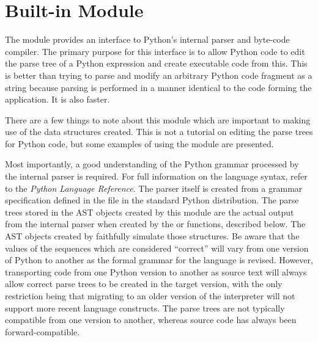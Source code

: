 %
%

\section{Built-in Module }
\label{module-parser}

The  module provides an interface to Python's internal
parser and byte-code compiler.  The primary purpose for this interface
is to allow Python code to edit the parse tree of a Python expression
and create executable code from this.  This is better than trying
to parse and modify an arbitrary Python code fragment as a string
because parsing is performed in a manner identical to the code
forming the application.  It is also faster.

There are a few things to note about this module which are important
to making use of the data structures created.  This is not a tutorial
on editing the parse trees for Python code, but some examples of using
the  module are presented.

Most importantly, a good understanding of the Python grammar processed
by the internal parser is required.  For full information on the
language syntax, refer to the \emph{Python Language Reference}.  The
parser itself is created from a grammar specification defined in the file
 in the standard Python distribution.  The parse
trees stored in the AST objects created by this module are the
actual output from the internal parser when created by the
 or  functions, described below.  The AST
objects created by  faithfully simulate those
structures.  Be aware that the values of the sequences which are
considered ``correct'' will vary from one version of Python to another
as the formal grammar for the language is revised.  However,
transporting code from one Python version to another as source text
will always allow correct parse trees to be created in the target
version, with the only restriction being that migrating to an older
version of the interpreter will not support more recent language
constructs.  The parse trees are not typically compatible from one
version to another, whereas source code has always been
forward-compatible.


